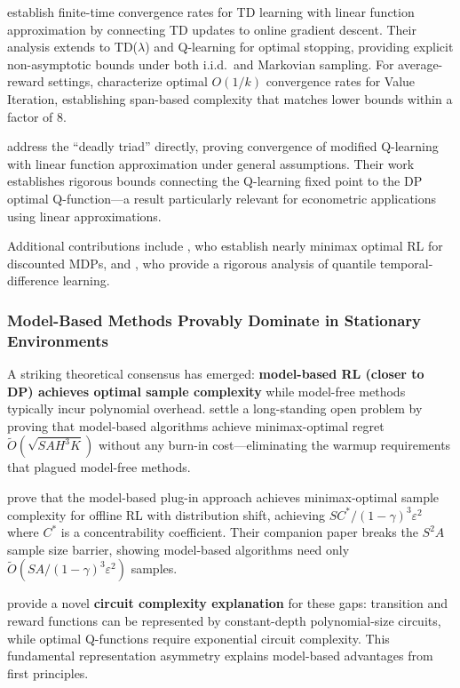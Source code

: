 \citet{bhandari2021finite} establish finite-time convergence rates for TD learning with linear function approximation by connecting TD updates to online gradient descent. Their analysis extends to TD($\lambda$) and Q-learning for optimal stopping, providing explicit non-asymptotic bounds under both i.i.d.\ and Markovian sampling. For average-reward settings, \citet{lee2025optimal} characterize optimal $O(1/k)$ convergence rates for Value Iteration, establishing span-based complexity that matches lower bounds within a factor of 8.

\citet{carvalho2020convergence} address the ``deadly triad'' directly, proving convergence of modified Q-learning with linear function approximation under general assumptions. Their work establishes rigorous bounds connecting the Q-learning fixed point to the DP optimal Q-function---a result particularly relevant for econometric applications using linear approximations.

Additional contributions include \citet{he2021nearly}, who establish nearly minimax optimal RL for discounted MDPs, and \citet{rowland2024quantile}, who provide a rigorous analysis of quantile temporal-difference learning.

\subsubsection{Model-Based Methods Provably Dominate in Stationary Environments}

A striking theoretical consensus has emerged: \textbf{model-based RL (closer to DP) achieves optimal sample complexity} while model-free methods typically incur polynomial overhead. \citet{zhang2024settling} settle a long-standing open problem by proving that model-based algorithms achieve minimax-optimal regret $\tilde{O}(\sqrt{SAH^3K})$ without any burn-in cost---eliminating the warmup requirements that plagued model-free methods.

\citet{li2024offline} prove that the model-based plug-in approach achieves minimax-optimal sample complexity for offline RL with distribution shift, achieving $SC^*/(1-\gamma)^3\varepsilon^2$ where $C^*$ is a concentrability coefficient. Their companion paper \citep{li2024breaking} breaks the $S^2A$ sample size barrier, showing model-based algorithms need only $\tilde{O}(SA/(1-\gamma)^3\varepsilon^2)$ samples.

\citet{zhu2024representation} provide a novel \textbf{circuit complexity explanation} for these gaps: transition and reward functions can be represented by constant-depth polynomial-size circuits, while optimal Q-functions require exponential circuit complexity. This fundamental representation asymmetry explains model-based advantages from first principles.


